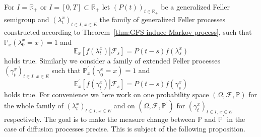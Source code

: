 \documentclass[a4paper,12pt]{article}
\theoremstyle{definition}
\theoremstyle{remark}
\numberwithin{equation}{section}
\numberwithin{theorem}{section}
\begin{document}
 
For $I=\mathbb{R}_{+}$
or $I=\left[ 0,T\right] \subset \mathbb{R}_{+}$ let $\left(P(t)\right)_{t\in\mathbb{R}_{+}}$ be a generalized Feller
semigroup and $\left(\lambda_{t}^{x}\right)_{t\in I,\,x\in E}$ the family of generalized Feller processes constructed according to Theorem~\ref{thm:GFS induce Markov process}, such that $\mathbb{P}_x\left(\lambda_{0}^{x}=x\right)=1$
and 
\[
\mathbb{E}_x\left[\left.f(\lambda^x_{t})\right|\mathcal{F}_{s}\right]=P\left(t-s\right)f(\lambda^x_{s})\label{eq:GFS yields Markov process} 
\]
holds true. 
Similarly we consider a family of extended Feller processes $\left(\gamma_{t}^{x}\right)_{t\in I,\,x\in E}$ such that $\mathbb{P}^{'}_x\left(\gamma_{0}^{x}=x\right)=1$
and 
\[
\mathbb{E}^{'}_x\left[\left.f(\gamma^x_{t})\right|\mathcal{F}_{s}\right]=P\left(t-s\right)f(\gamma^x_{s})
\]
holds true. For convenience we here work 
on one probability space $(\Omega,\mathcal{F},\mathbb{P})$ for the whole family of $(\lambda_{t}^{x})_{t\in I,\,x\in E}$ 
and on $(\Omega,\mathcal{F},\mathbb{P}^{'})$ for $(\gamma_{t}^{x})_{t\in I,\,x\in E}$ respectively. 
The goal is to make the measure change between $\mathbb{P}$ and $\mathbb{P}^{'}$ in the case of diffusion processes precise. This is subject of the following proposition.
 
\end{document}
